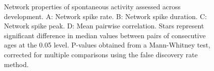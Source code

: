 \documentclass{article}
\begin{document}
\begin{figure}
  \centering
  \caption{Network properties of spontaneous activity assessed
    across development.  A: Network spike rate.  B: Network spike
    duration.  C: Network spike peak. D: Mean pairwise correlation. Stars represent significant difference in median values between pairs of consecutive ages at the 0.05 level. P-values obtained from a Mann-Whitney test, corrected for multiple comparisons using the false discovery rate method.}
\end{figure}
\end{document}
